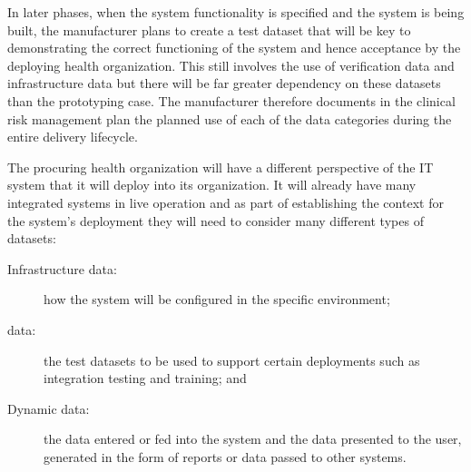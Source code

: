 In later phases, when the system functionality is specified and the system is being built, the manufacturer plans to create a test \gls{dataset} that will be key to demonstrating the correct functioning of the system and hence acceptance by the deploying health organization. This still involves the use of \gls{verification} data and infrastructure data but there will be far greater dependency on these \glspl{dataset} than the prototyping case. The manufacturer therefore documents in the clinical risk management plan the planned use of each of the data categories during the entire delivery lifecycle.

\begin{minipage}[t]{0.73\textwidth}
	The procuring health organization will have a different perspective of the IT system that it will deploy into its organization. It will already have many integrated systems in live operation and as part of establishing the context for the system's deployment they will need to consider many different types of \glspl{dataset}:
\end{minipage}
\begin{minipage}[t]{0.25\textwidth}
  \centering{}
\end{minipage}
	\begin{description}
		\item[Infrastructure data:] how the system will be configured in the specific environment;
		\item[ data:] the test \glspl{dataset} to be used to support certain deployments such as integration testing and training; and
		\item[Dynamic data:] the data entered or fed into the system and the data presented to the user, generated in the form of reports or data passed to other systems.
	\end{description}

